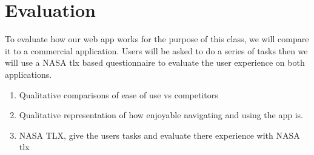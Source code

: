 \documentclass{chi2011}
\begin{document}
\section{Evaluation}
To evaluate how our web app works for the purpose of this class, we will compare it to a commercial
application. Users will be asked to do a series of tasks then we will use a
NASA tlx based questionnaire to evaluate the user experience on both
applications. 
\begin{enumerate}
    \item Qualitative comparisons of ease of use vs competitors
    \item Qualitative representation of how enjoyable navigating and using the app is.
	\item NASA TLX, give the users tasks and evaluate there experience with NASA tlx
\end{enumerate}



\end{document}
